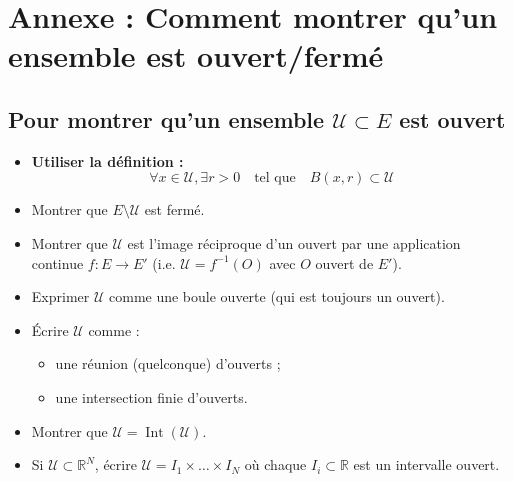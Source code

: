 \documentclass[a4paper]{article}
\newcommand{\R}{\mathbb{R}}
\begin{document}
\newpage
\section*{Annexe : Comment montrer qu'un ensemble est ouvert/fermé}
\subsection*{Pour montrer qu'un ensemble \(\mathcal{U} \subset E\) est ouvert}
\begin{itemize}
    \item \textbf{Utiliser la définition :}
    \[
    \forall x \in \mathcal{U}, \exists r > 0 \quad \text{tel que} \quad B(x, r) \subset \mathcal{U}
    \]
    \item Montrer que \( E \setminus \mathcal{U} \) est fermé.
    \item Montrer que \(\mathcal{U}\) est l'image réciproque d'un ouvert par une application continue \(f:E \to E'\) (i.e. \(\mathcal{U} = f^{-1}(O)\) avec \(O\) ouvert de \(E'\)).
    \item Exprimer \(\mathcal{U}\) comme une boule ouverte (qui est toujours un ouvert).
    \item Écrire \(\mathcal{U}\) comme :
    \begin{itemize}
        \item une réunion (quelconque) d'ouverts ;
        \item une intersection finie d'ouverts.
    \end{itemize}
    \item Montrer que \(\mathcal{U} = \operatorname{Int}(\mathcal{U})\).
    \item Si \(\mathcal{U} \subset \R^N\), écrire \(\mathcal{U} = I_1 \times \dots \times I_N\) où chaque \( I_i \subset \R\) est un intervalle ouvert.
\end{itemize}
\end{document}
